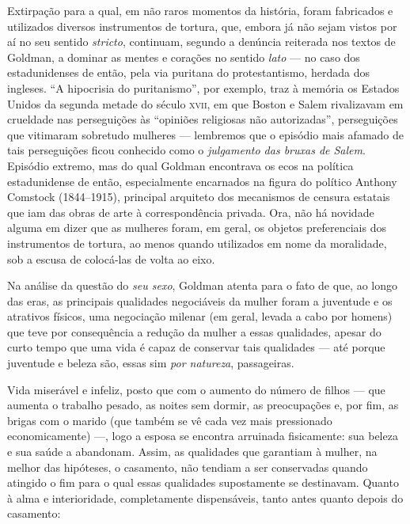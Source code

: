 Extirpação para a qual, em não raros momentos da
história, foram fabricados e utilizados diversos instrumentos de
tortura, que, embora já não sejam vistos por aí no seu
sentido \emph{stricto}, continuam, segundo a denúncia reiterada nos
textos de Goldman, a dominar as mentes e corações no sentido
\emph{lato} --- no caso dos estadunidenses de então, pela via puritana do
protestantismo, herdada dos ingleses. ``A
hipocrisia do puritanismo'', por exemplo, traz à memória os Estados Unidos da
segunda metade do século \textsc{xvii}, em que Boston e Salem rivalizavam em
crueldade nas perseguições às ``opiniões religiosas não autorizadas'',
perseguições que vitimaram sobretudo mulheres --- lembremos que o
episódio mais afamado de tais perseguições ficou conhecido como o
\textit{julgamento das bruxas de Salem}.
Episódio extremo, mas do qual Goldman encontrava os ecos na política
estadunidense de então, especialmente encarnados na figura do político
Anthony Comstock (1844--1915), principal arquiteto dos mecanismos de
censura estatais que iam das obras de arte à correspondência privada.
Ora, não há novidade alguma em dizer que as mulheres foram, em geral, os
objetos preferenciais dos instrumentos de tortura, ao menos quando
utilizados em nome da moralidade, sob a escusa de colocá-las de volta ao
eixo.

Na análise da questão do \textit{seu sexo}, Goldman
atenta para o fato de que, ao longo das eras, as principais qualidades
negociáveis da mulher foram a juventude e os atrativos físicos, uma
negociação milenar (em geral, levada a cabo por homens) que teve por
consequência a redução da mulher a essas qualidades, apesar do curto
tempo que uma vida é capaz de
conservar tais qualidades --- até porque juventude e beleza são, essas sim \emph{por natureza}, passageiras.

Vida miserável e infeliz, posto que com o aumento do número
de filhos --- que aumenta o trabalho pesado, as noites sem
dormir, as preocupações e, por fim, as brigas com o marido (que também
se vê cada vez mais pressionado economicamente) ---, logo a
esposa se encontra arruinada fisicamente: sua beleza e sua saúde a
abandonam. Assim, as qualidades que garantiam à mulher, na
melhor das hipóteses, o casamento, não tendiam a ser conservadas quando
atingido o fim para o qual essas qualidades supostamente se destinavam.
Quanto à alma e interioridade, completamente dispensáveis,
tanto antes quanto depois do casamento:

